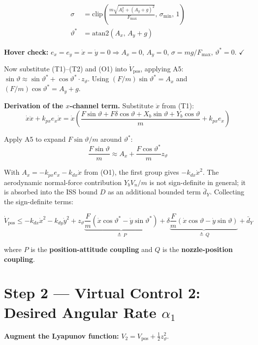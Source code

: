 \documentclass[11pt,a4paper]{article}
\theoremstyle{plain}
\theoremstyle{remark}
\newcommand{\vth}{\vartheta}
\newcommand{\vths}{\vartheta^*}
\newcommand{\zth}{z_{\vth}}
\newcommand{\clip}{\mathrm{clip}}
\newcommand{\Fmax}{F_{\max}}
\begin{document}
\begin{align}
  \sigma &= \clip\!\left(\frac{m\sqrt{A_x^2 + (A_y+g)^2}}{\Fmax},\, \sigma_{\min},\, 1\right) \tag{O2} \\[4pt]
  \vths &= \mathrm{atan2}(A_x,\, A_y + g) \tag{O3}
\end{align}

\textbf{Hover check:} $e_x = e_y = \dot x = \dot y = 0 \Rightarrow A_x = 0$, $A_y = 0$, $\sigma = mg/\Fmax$, $\vths = 0$. $\checkmark$

Now substitute (T1)--(T2) and (O1) into $\dot V_{\mathrm{pos}}$, applying A5: $\sin\vth \approx \sin\vths + \cos\vths\cdot \zth$. Using $(F/m)\sin\vths = A_x$ and $(F/m)\cos\vths = A_y + g$.

\textbf{Derivation of the $x$-channel term.} Substitute $\ddot x$ from (T1):
\[
  \dot x\ddot x + k_{px}e_x\dot x = \dot x\!\left(\frac{F\sin\vth + F\delta\cos\vth + X_b\sin\vth + Y_b\cos\vth}{m} + k_{px}e_x\right)
\]

Apply A5 to expand $F\sin\vth/m$ around $\vths$:
\[
  \frac{F\sin\vth}{m} \approx A_x + \frac{F\cos\vths}{m}\zth
\]

With $A_x = -k_{px}e_x - k_{dx}\dot x$ from (O1), the first group gives $-k_{dx}\dot x^2$. The aerodynamic normal-force contribution $Y_b V_n/m$ is not sign-definite in general; it is absorbed into the ISS bound $D$ as an additional bounded term $\bar{d}_Y$. Collecting the sign-definite terms:

\begin{equation}
  \dot V_{\mathrm{pos}} \leq -k_{dx}\dot x^2 - k_{dy}\dot y^2
  + \zth \underbrace{\frac{F}{m}(\dot x\cos\vths - \dot y\sin\vths)}_{\triangleq\, P}
  + \delta \underbrace{\frac{F}{m}(\dot x\cos\vth - \dot y\sin\vth)}_{\triangleq\, Q}
  + \bar{d}_Y
  \tag{DV1}
\end{equation}

where $P$ is the \textbf{position-attitude coupling} and $Q$ is the \textbf{nozzle-position coupling}.

\section{Step 2 --- Virtual Control 2: Desired Angular Rate \texorpdfstring{$\alpha_1$}{alpha1}}

\textbf{Augment the Lyapunov function:} $V_2 = V_{\mathrm{pos}} + \tfrac{1}{2}\zth^2$.
\end{document}
